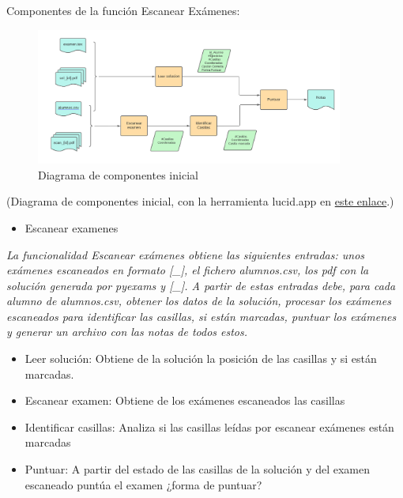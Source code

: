 Componentes de la función Escanear Exámenes:

\begin{figure}
    \centering
    \includegraphics[width=0.9\textwidth]{figures/componentes_escanear1.png}
    \caption{Diagrama de componentes inicial}
    \label{fig:diagrama1}
\end{figure}

(Diagrama de componentes inicial, con la herramienta lucid.app en \href{https://lucid.app/lucidchart/e4e3ac39-6d50-46bd-bb09-bdcd95795a17/edit?beaconFlowId=4856D1B22948543C&invitationId=inv_6249bed2-3464-41f5-808e-d6051f99857c&page=0_0#}{este enlace}.)

\begin{itemize}
    \item  Escanear examenes
\end{itemize}
\textit{La funcionalidad Escanear exámenes obtiene las siguientes entradas: unos exámenes escaneados en formato [\_], el fichero alumnos.csv, los pdf con la solución generada por pyexams y [\_]. A partir de estas entradas debe, para cada alumno de alumnos.csv, obtener los datos de la solución, procesar los exámenes escaneados para identificar las casillas, si están marcadas, puntuar los exámenes y generar un archivo con las notas de todos estos.}

\begin{itemize}
    \item Leer solución: Obtiene de la solución la posición de las casillas y si están marcadas.
    \item Escanear examen: Obtiene de los exámenes escaneados las casillas
    \item Identificar casillas: Analiza si las casillas leídas por escanear exámenes están marcadas
    \item Puntuar: A partir del estado de las casillas de la solución y del examen escaneado puntúa el examen ¿forma de puntuar?
\end{itemize}


